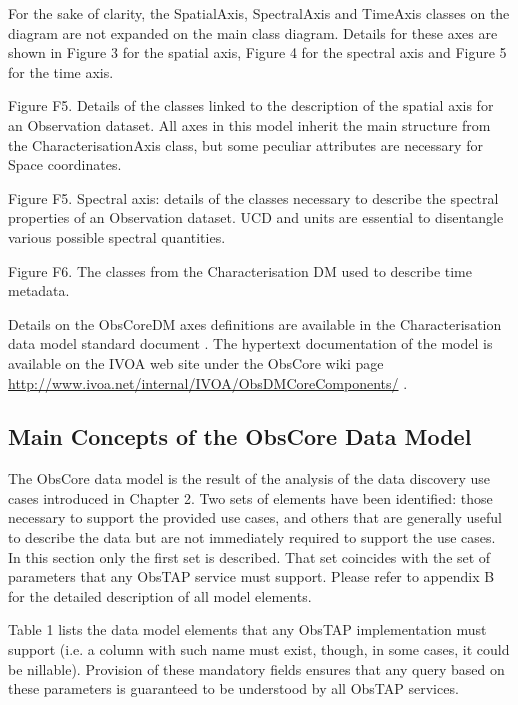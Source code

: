 \documentclass[11pt,a4paper]{ivoa}
\begin{document}
For the sake of clarity, the SpatialAxis, SpectralAxis and TimeAxis classes on the diagram are not expanded on the main
class diagram. Details for these axes are shown in Figure 3 for the spatial axis, Figure 4 for the spectral axis and
Figure 5 for the time axis.

\label{bkm:Ref158037577}Figure F5. Details of the classes linked to the description of the
spatial axis for an Observation dataset. All axes in this model inherit the main structure from the
CharacterisationAxis class, but some peculiar attributes are necessary for Space coordinates.

\label{bkm:Ref158037643}Figure F5. Spectral axis: details of the classes necessary to
describe the spectral properties of an Observation dataset. UCD and units are essential to disentangle various possible
spectral quantities.

\label{bkm:Ref291003095}Figure F6.  The classes from the Characterisation DM used to
describe time metadata.

Details on the ObsCoreDM axes definitions are available in the Characterisation data model standard document
\cite{2008ivoa.spec.0325L}. The hypertext documentation of the model is available on the IVOA web site under the
ObsCore wiki page  \url{http://www.ivoa.net/internal/IVOA/ObsDMCoreComponents/} .

\subsection[Main Concepts of the ObsCore Data Model]{Main Concepts of the ObsCore Data Model}
The ObsCore data model is the result of the analysis of the data discovery use cases introduced in Chapter 2. Two sets
of elements have been identified: those necessary to support the provided use cases, and others that are generally
useful to describe the data but are not immediately required to support the use cases.  In this section only the first
set is described.  That set coincides with the set of parameters that any ObsTAP service must support. Please refer to
appendix B for the detailed description of all model elements. 

Table 1 lists the data model elements that any ObsTAP implementation must support (i.e. a column with such name must
exist, though, in some cases, it could be nillable).  Provision of these mandatory fields ensures that any query based
on these parameters is guaranteed to be understood by all ObsTAP services.
\end{document}

